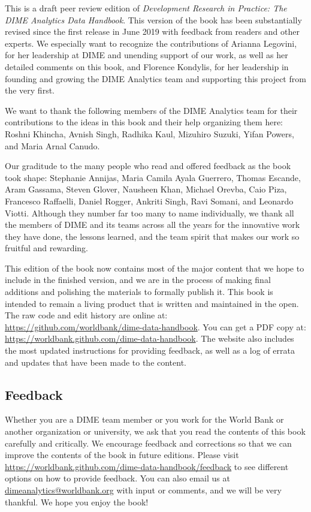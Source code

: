This is a draft peer review edition of
\textit{Development Research in Practice:
The DIME Analytics Data Handbook}.
This version of the book has been substantially revised
since the first release in June 2019
with feedback from readers and other experts.
We especially want to recognize the contributions of
Arianna Legovini, for her leadership at DIME and unending support of our work, 
as well as her detailed comments on this book, and 
Florence Kondylis, for her leadership in founding and growing the DIME Analytics team
and supporting this project from the very first.
 
We want to thank the following members 
of the DIME Analytics team for their contributions 
to the ideas in this book and their help organizing them here: 
Roshni Khincha, Avnish Singh, Radhika Kaul,
Mizuhiro Suzuki, Yifan Powers, and Maria Arnal Canudo.

Our graditude to the many people who read and offered feedback as the book took shape:
Stephanie Annijas,
Maria Camila Ayala Guerrero,
Thomas Escande,
Aram Gassama,
Steven Glover,
Nausheen Khan,
Michael Orevba,
Caio Piza,
Francesco Raffaelli,
Daniel Rogger,
Ankriti Singh,
Ravi Somani,
and Leonardo Viotti.
Although they number far too many to name individually, 
we thank all the members of DIME and its teams across all the years
for the innovative work they have done, the lessons learned,
and the team spirit that makes our work so fruitful and rewarding.

This edition of the book now contains most of the major content
that we hope to include in the finished version,
and we are in the process of making final additions
and polishing the materials to formally publish it.
This book is intended to remain a living product
that is written and maintained in the open.
The raw code and edit history are online at:
\url{https://github.com/worldbank/dime-data-handbook}.
You can get a PDF copy at:
\url{https://worldbank.github.com/dime-data-handbook}.
The website also includes the most updated instructions
for providing feedback, as well as
a log of errata and updates that have been made to the content.

\subsection{Feedback}

Whether you are a DIME team member or you work for the World Bank
or another organization or university,
we ask that you read the contents of this book carefully and critically.
We encourage feedback and corrections
so that we can improve the contents of the book
in future editions. Please visit
\url{https://worldbank.github.com/dime-data-handbook/feedback} to
see different options on how to provide feedback.
You can also email us at \url{dimeanalytics@worldbank.org}
with input or comments, and we will be very thankful.
We hope you enjoy the book!
